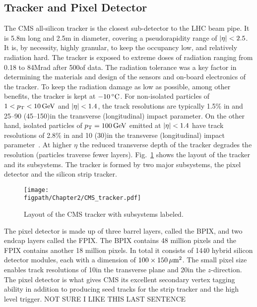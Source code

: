 \subsection{Tracker and Pixel Detector}
\label{sec:tracker_and_pixel}

The CMS all-silicon tracker is the closest sub-detector to the LHC beam pipe.
It is 5.8\unit{m} long and 2.5\unit{m} in diameter, covering a pseudorapidity range of $\lvert \eta \rvert<2.5$.
It is, by necessity, highly granular, to keep the occupancy low, and relatively radiation hard.
The tracker is exposed to extreme doses of radiation ranging from 0.18 to 84\unit{Mrad} after 500\fbinv of data.
The radiation tolerance was a key factor in determining the materials and design of the sensors and on-board electronics of the tracker.
To keep the radiation damage as low as possible, among other benefits, the tracker is kept at $-10\,^\circ\text{C}$.
For non-isolated particles of $1<p_{\mathrm{T}}<10\,\text{Ge\hspace{-.08em}V}$ and $\lvert \eta \rvert<1.4$, the track resolutions are typically 1.5\% in \pt and 25--90 (45--150)\mum in the transverse (longitudinal) impact parameter.
On the other hand, isolated particles of $p_{\mathrm{T}}=100\,\text{Ge\hspace{-.08em}V}$ emitted at $\lvert \eta \rvert<1.4$ have track resolutions of 2.8\% in \pt and 10 (30)\mum in the transverse (longitudinal) impact parameter~\cite{TRK-11-001}.
At higher $\eta$ the reduced transverse depth of the tracker degrades the resolution (particles traverse fewer layers).
Fig.~\ref{fig:CMS_tracker} shows the layout of the tracker and its subsystems. The tracker is formed by two major subsystems, the pixel detector and the silicon strip tracker.


\begin{figure}[!hbt]
	\centering
	\texttt{[image: \\figpath/Chapter2/CMS\_tracker.pdf]}
	\caption{Layout of the CMS tracker with subsystems labeled.}
	\label{fig:CMS_tracker}
\end{figure}

The pixel detector is made up of three barrel layers, called the BPIX, and two endcap layers called the FPIX.
The BPIX contains 48 million pixels and the FPIX contains another 18 million pixels.
In total it consists of 1440 hybrid silicon detector modules, each with a dimension of $100\times150\,\mu\text{m}^{2}$.
The small pixel size enables track resolutions of 10\mum in the transverse plane and 20\mum in the $z$-direction.
The pixel detector is what gives CMS its excellent secondary vertex tagging ability in addition to producing seed tracks for the strip tracker and the high level trigger.
NOT SURE I LIKE THIS LAST SENTENCE

